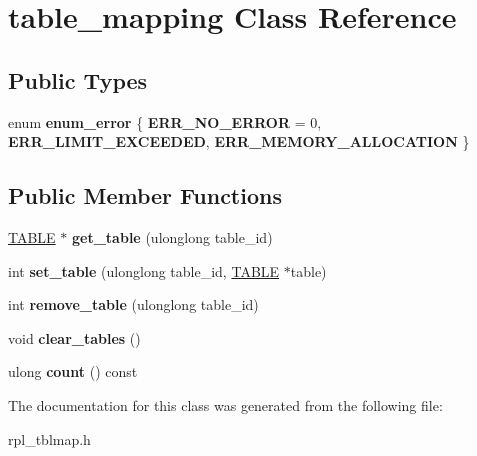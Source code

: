 \hypertarget{classtable__mapping}{}\section{table\+\_\+mapping Class Reference}
\label{classtable__mapping}
\subsection*{Public Types}
\begin{DoxyCompactItemize}
\item 
\mbox{\label{classtable__mapping_a6c0d0f980ceb995de03b958df47a8ae0}} 
enum {\bfseries enum\+\_\+error} \{ {\bfseries E\+R\+R\+\_\+\+N\+O\+\_\+\+E\+R\+R\+OR} = 0, 
{\bfseries E\+R\+R\+\_\+\+L\+I\+M\+I\+T\+\_\+\+E\+X\+C\+E\+E\+D\+ED}, 
{\bfseries E\+R\+R\+\_\+\+M\+E\+M\+O\+R\+Y\+\_\+\+A\+L\+L\+O\+C\+A\+T\+I\+ON}
 \}
\end{DoxyCompactItemize}
\subsection*{Public Member Functions}
\begin{DoxyCompactItemize}
\item 
\mbox{\label{classtable__mapping_a0bdb1739983dad4469b6837fe0dc4f4d}} 
\mbox{\hyperlink{structTABLE}{T\+A\+B\+LE}} $\ast$ {\bfseries get\+\_\+table} (ulonglong table\+\_\+id)
\item 
\mbox{\label{classtable__mapping_a5925b0f3b43d8c0d4a5fd2c28441de13}} 
int {\bfseries set\+\_\+table} (ulonglong table\+\_\+id, \mbox{\hyperlink{structTABLE}{T\+A\+B\+LE}} $\ast$table)
\item 
\mbox{\label{classtable__mapping_a88acbeef581ecab71fbc7f907fa8c7b1}} 
int {\bfseries remove\+\_\+table} (ulonglong table\+\_\+id)
\item 
\mbox{\label{classtable__mapping_a043a4635aac67b574359f6b4612782a3}} 
void {\bfseries clear\+\_\+tables} ()
\item 
\mbox{\label{classtable__mapping_a30ea220e5c61a9a25f6d82d0110870ed}} 
ulong {\bfseries count} () const
\end{DoxyCompactItemize}


The documentation for this class was generated from the following file\+:\begin{DoxyCompactItemize}
\item 
rpl\+\_\+tblmap.\+h\end{DoxyCompactItemize}
